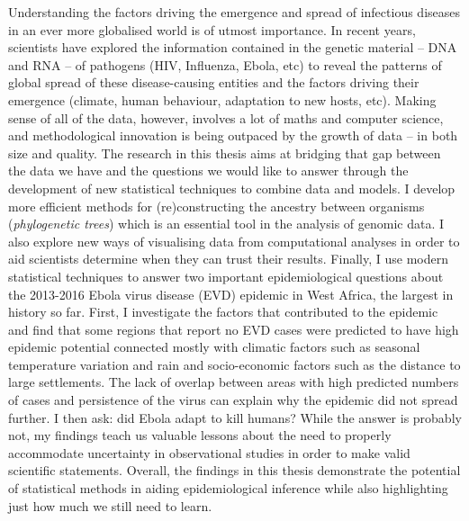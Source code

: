 Understanding the factors driving the emergence and spread of infectious diseases in an ever more globalised world is of utmost importance.
In recent years, scientists have explored the information contained in the genetic material -- DNA and RNA -- of pathogens (HIV, Influenza, Ebola, etc) to reveal the patterns of global spread of these disease-causing entities and the factors driving their emergence (climate, human behaviour, adaptation to new hosts, etc).
Making sense of all of the data, however, involves a lot of maths and computer science, and methodological innovation is being outpaced by the growth of data -- in both  size and quality.
The research in this thesis aims at bridging that gap between the data we have and the questions we would like to answer through the development of new statistical techniques to combine data and models.
I develop more efficient methods for (re)constructing the ancestry between organisms (\textit{phylogenetic trees}) which is an essential tool in the analysis of genomic data.
I also explore new ways of visualising data from computational analyses in order to aid scientists determine when they can trust their results.
Finally, I use modern statistical techniques to answer two important epidemiological questions about the 2013-2016 Ebola virus disease (EVD) epidemic in West Africa, the largest in history so far.
First, I investigate the factors that contributed to the epidemic and find that some regions that report no EVD cases were predicted to have high epidemic potential connected mostly with climatic factors such as seasonal temperature variation and rain and socio-economic factors such as the distance to large settlements.
The lack of overlap between areas with high predicted numbers of cases and persistence of the virus can explain why the epidemic did not spread further.
I then ask: did Ebola adapt to kill humans? While the answer is probably not, my findings teach us valuable lessons about the need to properly accommodate uncertainty in observational studies in order to make valid scientific statements.
Overall, the findings in this thesis demonstrate the potential of statistical methods in aiding epidemiological inference while also highlighting just how much we still need to learn.